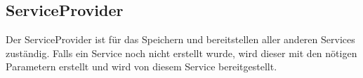 \subsection{ServiceProvider}
Der ServiceProvider ist für das Speichern und bereitstellen aller anderen Services zuständig.
Falls ein Service noch nicht erstellt wurde, wird dieser mit den nötigen Parametern erstellt
und wird von diesem Service bereitgestellt.
